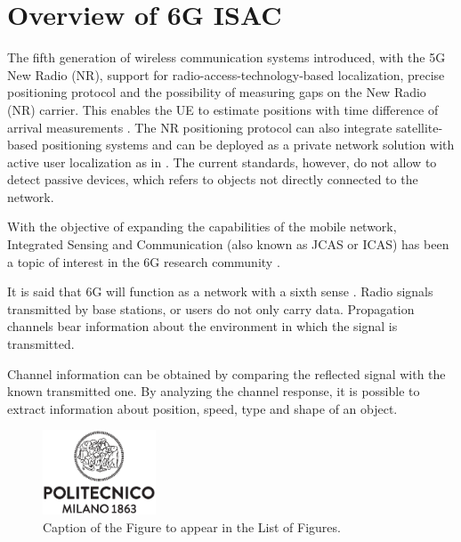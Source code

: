 \chapter{Overview of 6G ISAC}

The fifth generation of wireless communication systems introduced, with the 5G New Radio (NR), support for radio-access-technology-based localization, precise positioning protocol and the possibility of measuring gaps on the New Radio (NR) carrier. This enables the UE to estimate positions with time difference of arrival measurements \cite{Keating_Saily_Hulkkonen_Karjalainen_2019} . \newline
The NR positioning protocol can also integrate satellite-based positioning systems and can be deployed as a private network solution with active user localization as in \cite{Henninger_Abrudan_Mandelli_Arnold_Saur_Kolmonen_Klein_Schlitter_Brink_2022}.
The current standards, however, do not allow to detect passive devices, which refers to objects not directly connected to the network.

With the objective of expanding the capabilities of the mobile network, Integrated Sensing and Communication (also known as JCAS or ICAS) has been a topic of interest in the 6G research community \cite{Mandelli_Henninger_Bauhofer_Wild_2023}. 

It is said that 6G will function as a network with a sixth sense \cite{Viswanathan_Wild_2021}. Radio signals transmitted by base stations, or users do not only carry data. Propagation channels bear information about the environment in which the signal is transmitted. 

Channel information can be obtained by comparing the reflected signal with the known transmitted one. By analyzing the channel response, it is possible to extract information about position, speed, type and shape of an object.

\begin{figure}[H]
	\centering
	\includegraphics[width=0.3\textwidth]{Images/logo_polimi_scritta.eps}
	\caption{Caption of the Figure to appear in the List of Figures.}
	\label{fig:ISAC-scheme}
\end{figure}


